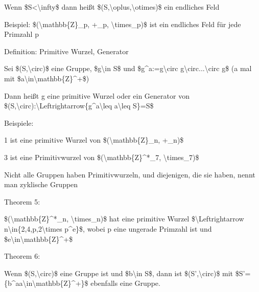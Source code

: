 \documentclass[a4paper]{article}
\begin{document}
\begin{multicols}{3}
\begin{itemize*}
\begin{itemize*}
                  \item Wenn \$\textbar S\textbar\textless\textbackslash infty\$ dann heißt \$(S,\textbackslash oplus,\textbackslash otimes)\$ ein endliches Feld
            \end{itemize*}
            \item Beispiel: \$(\textbackslash mathbb\{Z\}\_p, +\_p,
            \textbackslash times\_p)\$ ist ein endliches Feld für jede Primzahl p
            \item Definition: Primitive Wurzel, Generator
            \begin{itemize*}
                  \item Sei \$(S,\textbackslash circ)\$ eine Gruppe, \$g\textbackslash in S\$ und \$g\^{}a:=g\textbackslash circ g\textbackslash circ...\textbackslash circ g\$ (a mal mit \$a\textbackslash in\textbackslash mathbb\{Z\}\^{}+\$)
                  \item Dann heißt g eine primitive Wurzel oder ein Generator von \$(S,\textbackslash circ):\textbackslash Leftrightarrow\{g\^{}a\textbackslash leq a\textbackslash leq \textbar S\textbar\}=S\$
                  \item Beispiele:
                  \begin{itemize*} \item 1 ist eine primitive Wurzel von \$(\textbackslash mathbb\{Z\}\_n, +\_n)\$ \item 3 ist eine Primitivwurzel von \$(\textbackslash mathbb\{Z\}\^{}*\_7, \textbackslash times\_7)\$ \end{itemize*}
                  \item Nicht alle Gruppen haben Primitivwurzeln, und diejenigen, die sie haben, nennt man zyklische Gruppen
            \end{itemize*}
            \item Theorem 5:
            \begin{itemize*}
                  \item \$(\textbackslash mathbb\{Z\}\^{}*\_n, \textbackslash times\_n)\$ hat eine primitive Wurzel \$\textbackslash Leftrightarrow n\textbackslash in\{2,4,p,2\textbackslash times p\^{}e\}\$, wobei p eine ungerade Primzahl ist und \$e\textbackslash in\textbackslash mathbb\{Z\}\^{}+\$
            \end{itemize*}
            \item Theorem 6:
            \begin{itemize*}
                  \item Wenn \$(S,\textbackslash circ)\$ eine Gruppe ist und \$b\textbackslash in S\$, dann ist \$(S',\textbackslash circ)\$ mit \$S'=\{b\^{}a\textbar a\textbackslash in\textbackslash mathbb\{Z\}\^{}+\}\$ ebenfalls eine Gruppe.

\end{itemize*}
\end{itemize*}
\end{multicols}
\end{document}
